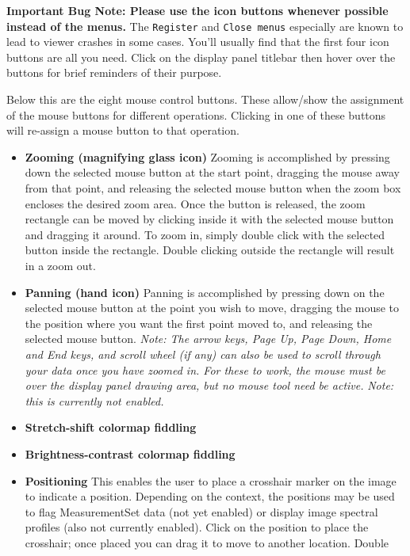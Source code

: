 {\bf Important Bug Note: Please use the icon buttons whenever possible
 instead of the menus.}  The {\tt Register} and {\tt Close menus}
 especially are known to lead to viewer crashes in some cases.  You'll
 usually find that the first four icon buttons are all you need.
 Click on the display panel titlebar then hover over the buttons for
 brief reminders of their purpose.


Below this are the eight mouse control buttons. These allow/show the
assignment of the mouse buttons for different operations. Clicking in
one of these buttons will re-assign a mouse button to that operation.

\begin{itemize}
   \item {\bf Zooming (magnifying glass icon)} Zooming is accomplished
     by pressing down the selected mouse button at the start point,
     dragging the mouse away from that point, and releasing the
     selected mouse button when the zoom box encloses the desired zoom
     area. Once the button is released, the zoom rectangle can be
     moved by clicking inside it with the selected mouse button and
     dragging it around. To zoom in, simply double click with the
     selected button inside the rectangle. Double clicking outside the
     rectangle will result in a zoom out.
   \item {\bf Panning (hand icon)} Panning is accomplished by pressing
     down on the selected mouse button at the point you wish to move,
     dragging the mouse to the position where you want the first point
     moved to, and releasing the selected mouse button. {\it Note: The
     arrow keys, Page Up, Page Down, Home and End keys, and scroll
     wheel (if any) can also be used to scroll through your data once
     you have zoomed in. For these to work, the mouse must be over the
     display panel drawing area, but no mouse tool need be active.}
     {\it Note: this is currently not enabled.}
   \item {\bf Stretch-shift colormap fiddling } 
   \item {\bf Brightness-contrast colormap fiddling} 
   \item {\bf Positioning} This enables the user to place a crosshair
     marker on the image to indicate a position. Depending on the
     context, the positions may be used to flag MeasurementSet data
     (not yet enabled) or display image spectral profiles (also not
     currently enabled). Click on the position to place the crosshair;
     once placed you can drag it to move to another location. Double

\end{itemize}
